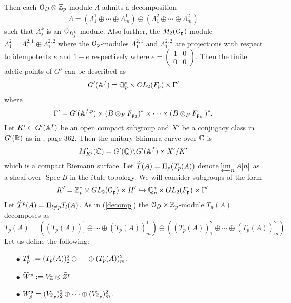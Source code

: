 \documentclass{amsart}
\newcommand{\inj}{\hookrightarrow}
\numberwithin{equation}{section}
\DeclareMathOperator{\Spec}{\mathrm{Spec}}
\begin{document}
Then each $\mathcal{O}_D \otimes \mathbb{Z}_p$-module $\Lambda$ admits a decomposition
\begin{align}
\label{decomp}
\Lambda = (\Lambda_1^1 \oplus \cdots \oplus \Lambda_m^1) \oplus (\Lambda_1^2
\oplus \cdots \oplus \Lambda_m^2)
\end{align}
such that $\Lambda_j^k$ is an $\mathcal{O}_{D_j^k}$-module. Also further, the 
$M_2(\mathcal{O}_{\mathfrak{p}})$-module  $\Lambda_1^2 = \Lambda_1^{2,1} \oplus \Lambda_1^{2,2}$
where the $\mathcal{O}_{\mathfrak{p}}$-modules $\Lambda_1^{2,1}$ and $\Lambda_1^{2,2}$ are 
projections with respect to idempotents $e$ and $1-e$ respectively where 
$e= \left(\begin{array}{ll} 1 & 0 \\ 0 & 0 \end{array} \right)$.
Then the finite adelic points of $G'$ can be described as 
\begin{align}
\label{Gprime}
G'(\mathbb{A}^f)= \mathbb{Q}_p^* \times GL_2(F_{\mathfrak{p}}) \times \Gamma' 
\end{align}
where 
\begin{align}
\label{Gammaprime}
\Gamma'= G'(\mathbb{A}^{f,p}) \times (B \otimes_F F_{\mathfrak{p}_2})^* \times \cdots \times
(B \otimes_F F_{\mathfrak{p}_m})^*.
\end{align}
Let $K' \subset G'(\mathbb{A}^f)$ be an open compact subgroup and $X'$ be a 
conjugacy class in $G'(\mathbb{R})$ as in \cite{MR2027194}, page 362. Then the unitary 
Shimura curve over $\mathbb{C}$ is 
\begin{align}
\label{UShimura}
M_{K'}'(\mathbb{C}) = G'(\mathbb{Q}) \backslash G'(\mathbb{A}^f) \times X' / K' 
\end{align}
which is a compact Riemann surface. Let $\widehat{T}(A) = \Pi_p(T_p(A))$ denote 
$\varprojlim_n A[n]$ as a sheaf over $\Spec B$ in the \'{e}tale 
topology. We will consider subgroups of the form 
$$K'= \Z_p^* \times GL_2(\Ou_\gp)\times H' \inj \Q_p^* \times GL_2(F_\gp)
\times \Gamma'.$$
Let $\widehat{T}^p(A) = \Pi_{l \ne p} T_l(A)$. 
As in (\ref{decomp}) the $\mathcal{O}_D \times \mathbb{Z}_p$-module $T_p(A)$ decomposes as
$$T_p(A) = \left( (T_p(A))^1_1 \oplus \cdots \oplus (T_p(A))^1_m\right)
\oplus \left( (T_p(A))^2_1 \oplus \cdots \oplus (T_p(A))^2_m \right).
$$
Let us define the following:
\begin{enumerate} 
\item[$\bullet$] $T_p^{\mathfrak{p}} := (T_p(A))^2_2 \oplus \cdots \oplus (T_p(A))^2_m.$

\item[$\bullet$] $\widehat{W}^p:= V_{\mathbb{Z}} \otimes \widehat{Z}^p$.

\item[$\bullet$] $W_p^{\mathfrak{p}} = (V_{\mathbb{Z}_p})^2_2 \oplus \cdots \oplus 
(V_{\mathbb{Z}_p})^2_m$.
\end{enumerate}
\end{document}
